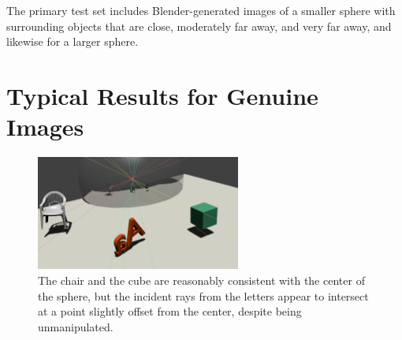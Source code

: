 \documentclass{thesis}
\begin{document}
The primary test set includes Blender-generated images of a smaller sphere with surrounding objects that are close, moderately far away, and very far away, and likewise for a larger sphere.


\section{Typical Results for Genuine Images}
\begin{figure}[h]
	\centering
    	\includegraphics[width=0.6\textwidth]{1b-genuine}
	\caption{The chair and the cube are reasonably consistent with the center of the sphere, but the incident rays from the letters appear to intersect at a point slightly offset from the center, despite being unmanipulated.}
	\label{1b-genuine}
\end{figure}
\end{document}
